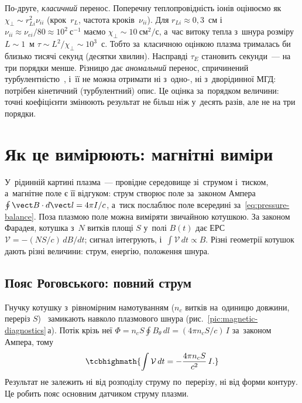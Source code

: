 По-друге, \emph{класичний} перенос. Поперечну теплопровідність іонів оцінюємо як
$\chi_\perp\sim r_{Li}^2\nu_{ii}$ (крок~$r_L$, частота кроків~$\nu_{ii}$). Для
$r_{Li}\approx0{,}3$~см і~$\nu_{ii}\approx\nu_{ei}/80\approx10^{2}~\mathrm{с}^{-1}$ маємо
$\chi_\perp\sim10~\mathrm{см}^2/\mathrm{с}$, а~час витоку тепла з~шнура розміру $L\sim1$~м
$\tau\sim L^2/\chi_\perp\sim10^{3}$~с. Тобто за~класичною оцінкою плазма трималась би близько тисячі секунд
(десятки хвилин). Насправді $\tau_E$ становить секунди~--- на три порядки менше. Різницю дає
\emph{аномальний} перенос, спричинений турбулентністю~\cite{chen2016introduction}, і~її не можна отримати ні з~одно-,
ні з~дворідинної МГД: потрібен кінетичний (турбулентний) опис. Це оцінка за~порядком величини: точні
коефіцієнти змінюють результат не більш ніж у~десять разів, але не на три порядки.


\section{Як це вимірюють: магнітні виміри}\label{sec:magnetic-diagnostics}

У~рідинній картині плазма~--- провідне середовище зі~струмом і~тиском, а~магнітне поле є
її відгуком: струм створює поле за~законом Ампера~$\oint\vect B\cdot d\vect l=4\pi I/c$, а~тиск
послаблює поле всередині за~\eqref{eq:pressure-balance}. Поза плазмою поле можна виміряти
звичайною котушкою. За законом Фарадея, котушка з~$N$ витків площі $S$ у~полі $B(t)$
дає ЕРС $\mathcal{V}=-(NS/c)\,dB/dt$; сигнал інтегрують, і~$\int\mathcal{V}\,dt\propto B$.
Різні геометрії котушок дають різні величини: струм, енергію, положення шнура.

\subsection*{Пояс Роговського: повний струм}
Гнучку котушку з~рівномірним намотуванням ($n_c$ витків на~одиницю довжини, переріз $S$)~\cite{anisimov2018}
замикають навколо плазмового шнура (рис.~\ref{pic:magnetic-diagnostics}\,а). Потік крізь неї
$\Phi=n_cS\oint B_\theta\,dl=(4\pi n_cS/c)\,I$ за~законом Ампера, тому
\begin{equation}\label{eq:rogowski}
	\tcbhighmath{\int\mathcal{V}\,dt=-\frac{4\pi n_cS}{c^2}\,I.}
\end{equation}
Результат не залежить ні від розподілу струму по~перерізу, ні від форми контуру. Це робить
пояс основним датчиком струму плазми.

